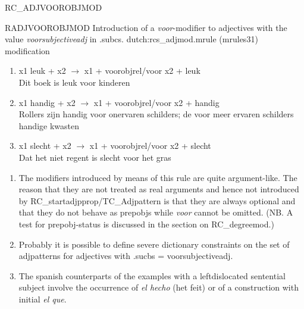 \begin{mruleclass}{RC\_ADJVOOROBJMOD}
\begin{members}
\begin{member}
 RADJVOOROBJMOD
Introduction of a {\em voor}-modifier to adjectives with the value {
\em voorsubjectiveadj} in .subcs. 
\file dutch:rcs\_adjmod.mrule (mrules31)
\semantics modification 
\example\mbox{}
\begin{enumerate}
  \item x1 leuk + x2 $\rightarrow$ x1 + voorobjrel/voor x2 + leuk \\
Dit boek is leuk  voor kinderen 
  \item x1 handig + x2 $\rightarrow$ x1 + voorobjrel/voor x2 + handig\\
Rollers zijn handig voor onervaren schilders;
de voor meer ervaren schilders handige kwasten
  \item x1 slecht + x2 $\rightarrow$ x1 + voorobjrel/voor x2 + slecht\\
Dat het niet regent is slecht voor het gras
\end{enumerate}
\remarks\mbox{}
\begin{enumerate}
\item The modifiers introduced by means of this rule are quite argument-like.
The reason that they are not treated as real arguments and hence not introduced
by RC\_startadjpprop/TC\_Adjpattern is that they are always optional and that 
they do not behave as prepobjs while {\em voor} cannot be omitted.
(NB.  A test for prepobj-status is discussed in 
the section on RC\_degreemod.)
\item
Probably it is possible to define severe dictionary constraints
on the set of adjpatterns for adjectives with .sucbs = voorsubjectiveadj.
\item The spanish counterparts of the examples with a leftdislocated sentential
subject involve the occurrence of {\em el hecho} (het feit) or of a
construction with initial {\em el que}.
\end{enumerate}
\end{member}
\end{members}
\end{mruleclass}

